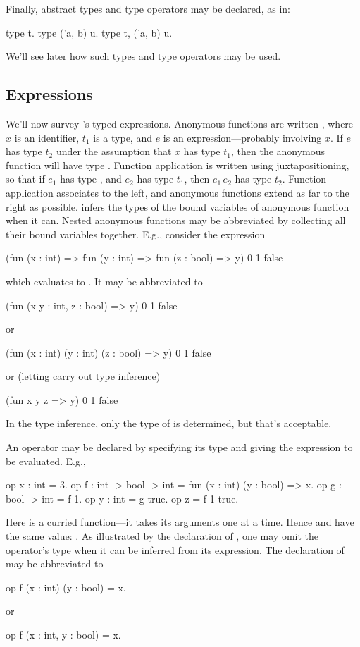 Finally, abstract types and type operators may be declared, as in:
\begin{easycrypt}{}{}
type t.
type ('a, b) u.
type t, ('a, b) u.
\end{easycrypt}
We'll see later how such types and type operators may be used.

\subsection{Expressions}

We'll now survey \EasyCrypt's typed expressions. Anonymous functions
are written , where $x$ is an identifier,
$t_1$ is a type, and $e$ is an expression---probably involving $x$.
If $e$ has type $t_2$ under the assumption that $x$ has type $t_1$,
then the anonymous function will have type .
Function application is written using juxtapositioning, so that if
$e_1$ has type , and $e_2$ has type $t_1$, then
$e_1\,e_2$ has type $t_2$. Function application associates to the
left, and anonymous functions extend as far to the right as possible.
\EasyCrypt infers the types of the bound variables of anonymous function
when it can. Nested anonymous functions may be abbreviated by
collecting all their bound variables together. E.g., consider the
expression
\begin{easycrypt}{}{}
(fun (x : int) => fun (y : int) => fun (z : bool) => y) 0 1 false
\end{easycrypt}
which evaluates to . It may be abbreviated to
\begin{easycrypt}{}{}
(fun (x y : int, z : bool) => y) 0 1 false
\end{easycrypt}
or
\begin{easycrypt}{}{}
(fun (x : int) (y : int) (z : bool) => y) 0 1 false
\end{easycrypt}
or (letting \EasyCrypt carry out type inference)
\begin{easycrypt}{}{}
(fun x y z => y) 0 1 false
\end{easycrypt}
In the type inference, only the type of  is determined, but
that's acceptable.

An operator may be declared by specifying its type and giving the
expression to be evaluated. E.g.,
\begin{easycrypt}{}{}
op x : int = 3.
op f : int -> bool -> int = fun (x : int) (y : bool) => x.
op g : bool -> int = f 1.
op y : int = g true.
op z = f 1 true.
\end{easycrypt}
Here  is a curried function---it takes its arguments one
at a time. Hence  and  have the same value: .
As illustrated by the declaration of , one may omit the
operator's type when it can be inferred from its expression.
The declaration of  may be abbreviated to
\begin{easycrypt}{}{}
op f (x : int) (y : bool) = x.
\end{easycrypt}
or
\begin{easycrypt}{}{}
op f (x : int, y : bool) = x.
\end{easycrypt}

